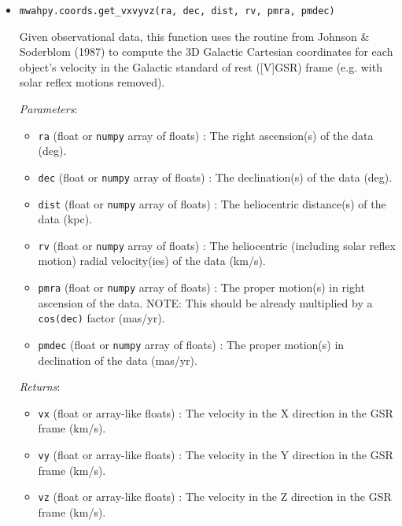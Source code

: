 \documentclass{article}
\begin{document}
\begin{itemize}
\item \verb!mwahpy.coords.get_vxvyvz(ra, dec, dist, rv, pmra, pmdec)!

Given observational data, this function uses the routine from Johnson \& Soderblom (1987) to compute the 3D Galactic Cartesian coordinates for each object's velocity in the Galactic standard of rest ([V]GSR) frame (e.g. with solar reflex motions removed).

\textit{Parameters}: \begin{itemize}

\item \verb!ra! (float or \verb!numpy! array of floats) : The right ascension(s) of the data (deg).

\item \verb!dec! (float or \verb!numpy! array of floats) : The declination(s) of the data (deg).

\item \verb!dist! (float or \verb!numpy! array of floats) : The heliocentric distance(s) of the data (kpc).

\item \verb!rv! (float or \verb!numpy! array of floats) : The heliocentric (including solar reflex motion) radial velocity(ies) of the data (km/s).

\item \verb!pmra! (float or \verb!numpy! array of floats) : The proper motion(s) in right ascension of the data. NOTE: This should be already multiplied by a \verb!cos(dec)! factor (mas/yr). 

\item \verb!pmdec! (float or \verb!numpy! array of floats) : The proper motion(s) in declination of the data (mas/yr).

\end{itemize}

\textit{Returns}: \begin{itemize}

\item \verb!vx! (float or array-like floats) : The velocity in the X direction in the GSR frame (km/s).

\item \verb!vy! (float or array-like floats) : The velocity in the Y direction in the GSR frame (km/s).

\item \verb!vz! (float or array-like floats) : The velocity in the Z direction in the GSR frame (km/s).

\end{itemize}




\end{itemize}
\end{document}
